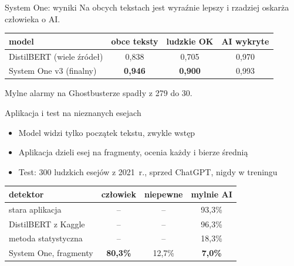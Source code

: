 \documentclass[aspectratio=169,11pt]{beamer}
\begin{document}
\begin{frame}{System One: wyniki}
  Na obcych tekstach jest wyraźnie lepszy
  i rzadziej oskarża człowieka o AI.

  \vspace{0.8em}
  \begin{center}
  \begin{tabular}{lccc}
    \toprule
    model & obce teksty & ludzkie OK & AI wykryte \\
    \midrule
    DistilBERT (wiele źródeł) & 0,838 & 0,705 & 0,970 \\
    System One v3 (finalny) & \textbf{0,946} & \textbf{0,900} & 0,993 \\
    \bottomrule
  \end{tabular}
  \end{center}

  \vspace{0.8em}
  Mylne alarmy na Ghostbusterze spadły z 279 do 30.
\end{frame}

\begin{frame}{Aplikacja i test na nieznanych esejach}
  \begin{itemize}
    \item Model widzi tylko początek tekstu, zwykle wstęp
    \item Aplikacja dzieli esej na fragmenty, ocenia każdy i bierze średnią
    \item Test: 300 ludzkich esejów z 2021~r., sprzed ChatGPT, nigdy w treningu
  \end{itemize}

  \vspace{0.6em}
  \begin{center}
  \begin{tabular}{lccc}
    \toprule
    detektor & człowiek & niepewne & mylnie AI \\
    \midrule
    stara aplikacja & -- & -- & 93,3\% \\
    DistilBERT z Kaggle & -- & -- & 96,3\% \\
    metoda statystyczna & -- & -- & 18,3\% \\
    System One, fragmenty & \textbf{80,3\%} & 12,7\% & \textbf{7,0\%} \\
    \bottomrule
  \end{tabular}
  \end{center}
\end{frame}
\end{document}
